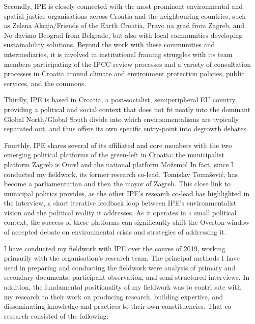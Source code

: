 \documentclass[a4paper, nobind]{templates/ociamthesis}
\begin{document}
Secondly, IPE is closely connected with the most prominent environmental and spatial justice organisations across Croatia and the neighbouring countries, such as Zelena Akcija/Friends of the Earth Croatia, Pravo na grad from Zagreb, and Ne davimo Beograd from Belgrade, but also with local communities developing sustainability solutions. Beyond the work with these communities and intermediaries, it is involved in institutional framing struggles with its team members participating of the IPCC review processes and a variety of consultation processes in Croatia around climate and environment protection policies, public services, and the commons.

Thirdly, IPE is based in Croatia, a post-socialist, semiperipheral EU country, providing a political and social context that does not fit neatly into the dominant Global North/Global South divide into which environmentalisms are typically separated out, and thus offers its own specific entry-point into degrowth debates.

Fourthly, IPE shares several of its affiliated and core members with the two emerging political platforms of the green-left in Croatia: the municipalist platform Zagreb is Ours! and the national platform Možemo! In fact, since I conducted my fieldwork, its former research co-lead, Tomislav Tomašević, has become a parliamentarian and then the mayor of Zagreb. This close link to municipal politics provides, as the other IPE's research co-lead has highlighted in the interview, a short iterative feedback loop between IPE's environmentalist vision and the political reality it addresses. As it operates in a small political context, the success of these platforms can significantly shift the Overton window of accepted debate on environmental crisis and strategies of addressing it.

I have conducted my fieldwork with IPE over the course of 2019, working primarily with the organisation's research team. The principal methods I have used in preparing and conducting the fieldwork were analysis of primary and secondary documents, participant observation, and semi-structured interviews. In addition, the fundamental positionality of my fieldwork was to contribute with my research to their work on producing research, building expertise, and disseminating knowledge and practices to their own constituencies. That co-research consisted of the following:
\end{document}
